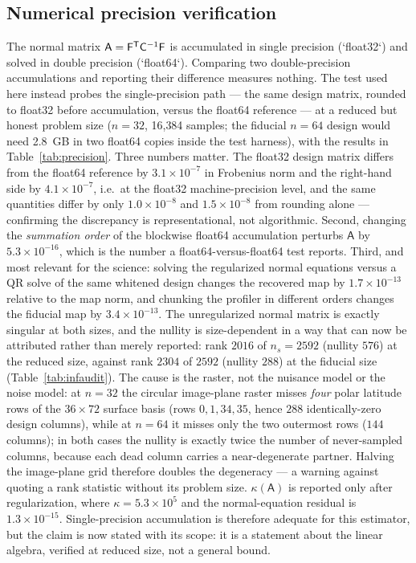 \documentclass[twocolumn,10pt]{article}
\begin{document}
\subsection{Numerical precision verification}
\label{sec:precisionnum}
The normal matrix $\mathsf{A}=\mathsf{F}^{\sf T}\mathsf{C}^{-1}\mathsf{F}$
is accumulated in single precision (`float32`) and solved in double precision
(`float64`).
Comparing two double-precision accumulations and reporting their difference
measures nothing. The test used here instead probes the single-precision path --- the same
design matrix, rounded to float32 before accumulation, versus the float64
reference --- at a reduced but honest problem size ($n=32$, 16{,}384 samples;
the fiducial $n=64$ design would need 2.8~GB in two float64 copies inside the
test harness), with the results in Table~\ref{tab:precision}.
Three numbers matter. The float32 design matrix differs from the float64
reference by $3.1\times10^{-7}$ in Frobenius norm and the right-hand side by
$4.1\times10^{-7}$, i.e.\ at the float32 machine-precision level, and the same
quantities differ by only $1.0\times10^{-8}$ and $1.5\times10^{-8}$ from
rounding alone --- confirming the discrepancy is representational, not
algorithmic. Second, changing the \emph{summation order} of the blockwise
float64 accumulation perturbs $\mathsf{A}$ by $5.3\times10^{-16}$, which is the
number a float64-versus-float64 test reports. Third, and most relevant for the science:
solving the regularized normal equations versus a QR solve of the same whitened
design changes the recovered map by $1.7\times10^{-13}$ relative to the map
norm, and chunking the profiler in different orders changes the fiducial map by
$3.4\times10^{-13}$.
The unregularized normal matrix is exactly singular at both sizes, and the
nullity is size-dependent in a way that can now be attributed rather than
merely reported: rank $2016$ of $n_s=2592$ (nullity $576$) at the reduced size,
against rank $2304$ of $2592$ (nullity $288$) at the fiducial size
(Table~\ref{tab:infaudit}). The cause is the raster, not the nuisance model or
the noise model: at $n=32$ the circular image-plane raster misses {\em four}
polar latitude rows of the $36\times72$ surface basis (rows $0,1,34,35$, hence
$288$ identically-zero design columns), while at $n=64$ it misses only the two
outermost rows ($144$ columns); in both cases the nullity is exactly twice the
number of never-sampled columns, because each dead column carries a
near-degenerate partner. Halving the image-plane grid therefore doubles the
degeneracy --- a warning against quoting a rank statistic without its problem
size. $\kappa(\mathsf{A})$ is reported only after regularization, where
$\kappa=5.3\times10^{5}$ and the normal-equation residual is
$1.3\times10^{-15}$. Single-precision accumulation is therefore adequate for
this estimator, but the claim is now stated with its scope: it is a statement
about the linear algebra, verified at reduced size, not a general bound.
\end{document}
